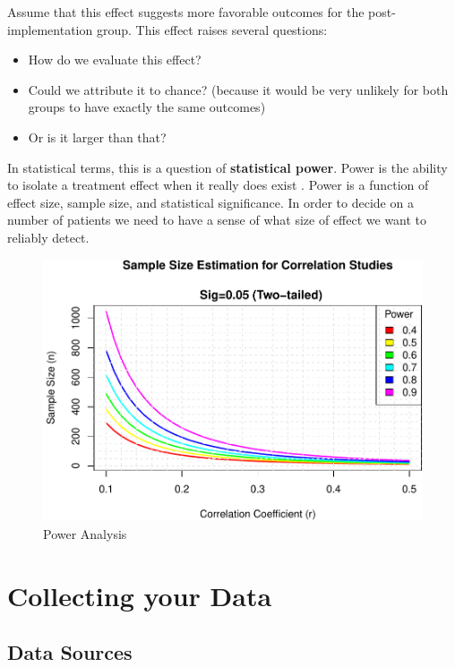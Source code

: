 \documentclass[
]{report}
\providecommand{\tightlist}{%
  \setlength{\itemsep}{0pt}\setlength{\parskip}{0pt}}
\begin{document}
Assume that this effect suggests more favorable outcomes for the
post-implementation group. This effect raises several questions:

\begin{itemize}
\tightlist
\item
  How do we evaluate this effect?
\item
  Could we attribute it to chance? (because it would be very unlikely
  for both groups to have exactly the same outcomes)
\item
  Or is it larger than that?
\end{itemize}

In statistical terms, this is a question of \textbf{statistical power}.
Power is the ability to isolate a treatment effect when it really does
exist \citep{Cohen1988}. Power is a function of effect size, sample
size, and statistical significance. In order to decide on a number of
patients we need to have a sense of what size of effect we want to
reliably detect.

\begin{figure}
\centering
\includegraphics{index_files/figure-latex/power-1.pdf}
\caption{Power Analysis}
\end{figure}

\hypertarget{collecting-your-data}{%
\chapter{Collecting your Data}\label{collecting-your-data}}

\hypertarget{data-sources}{%
\section{Data Sources}\label{data-sources}}
\end{document}

